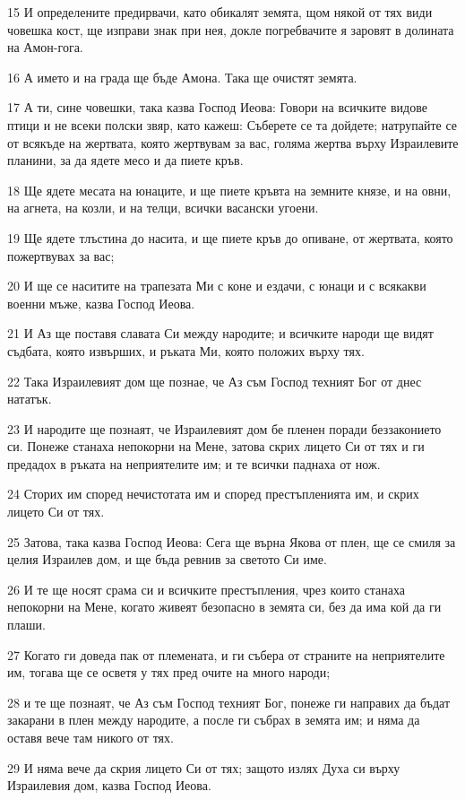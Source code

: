 \par 15 И определените предирвачи, като обикалят земята, щом някой от тях види човешка кост, ще изправи знак при нея, докле погребвачите я заровят в долината на Амон-гога.
\par 16 А името и на града ще бъде Амона. Така ще очистят земята.
\par 17 А ти, сине човешки, така казва Господ Иеова: Говори на всичките видове птици и не всеки полски звяр, като кажеш: Съберете се та дойдете; натрупайте се от всякъде на жертвата, която жертвувам за вас, голяма жертва върху Израилевите планини, за да ядете месо и да пиете кръв.
\par 18 Ще ядете месата на юнаците, и ще пиете кръвта на земните князе, и на овни, на агнета, на козли, и на телци, всички васански угоени.
\par 19 Ще ядете тлъстина до насита, и ще пиете кръв до опиване, от жертвата, която пожертвувах за вас;
\par 20 И ще се наситите на трапезата Ми с коне и ездачи, с юнаци и с всякакви военни мъже, казва Господ Иеова.
\par 21 И Аз ще поставя славата Си между народите; и всичките народи ще видят съдбата, която извърших, и ръката Ми, която положих върху тях.
\par 22 Така Израилевият дом ще познае, че Аз съм Господ техният Бог от днес нататък.
\par 23 И народите ще познаят, че Израилевият дом бе пленен поради беззаконието си. Понеже станаха непокорни на Мене, затова скрих лицето Си от тях и ги предадох в ръката на неприятелите им; и те всички паднаха от нож.
\par 24 Сторих им според нечистотата им и според престъпленията им, и скрих лицето Си от тях.
\par 25 Затова, така казва Господ Иеова: Сега ще върна Якова от плен, ще се смиля за целия Израилев дом, и ще бъда ревнив за светото Си име.
\par 26 И те ще носят срама си и всичките престъпления, чрез които станаха непокорни на Мене, когато живеят безопасно в земята си, без да има кой да ги плаши.
\par 27 Когато ги доведа пак от племената, и ги събера от страните на неприятелите им, тогава ще се осветя у тях пред очите на много народи;
\par 28 и те ще познаят, че Аз съм Господ техният Бог, понеже ги направих да бъдат закарани в плен между народите, а после ги събрах в земята им; и няма да оставя вече там никого от тях.
\par 29 И няма вече да скрия лицето Си от тях; защото излях Духа си върху Израилевия дом, казва Господ Иеова.

